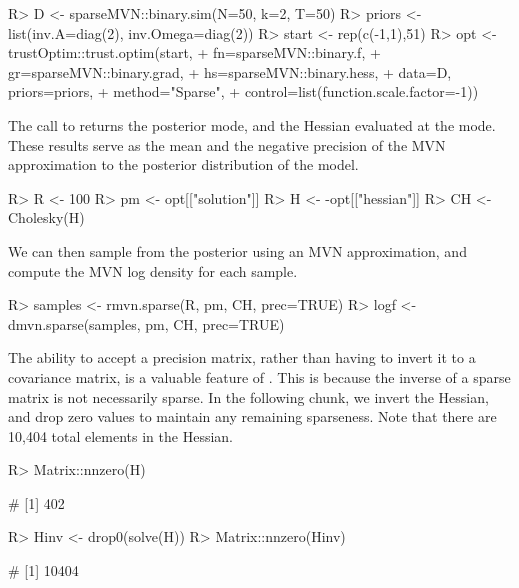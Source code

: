 \documentclass[codesnippet]{jss}\usepackage[]{graphicx}\usepackage[]{color}
\newcommand{\func}[1]{\code{#1}}
\begin{document}
\begin{Schunk}
\begin{Sinput}
R> D <- sparseMVN::binary.sim(N=50, k=2, T=50)
R> priors <- list(inv.A=diag(2), inv.Omega=diag(2))
R> start <- rep(c(-1,1),51)
R> opt <- trustOptim::trust.optim(start,
+                                fn=sparseMVN::binary.f,
+                                gr=sparseMVN::binary.grad,
+                                hs=sparseMVN::binary.hess,
+                                data=D, priors=priors,
+                                method="Sparse",
+                                control=list(function.scale.factor=-1))
\end{Sinput}
\end{Schunk}

The call to \func{trust.optim} returns the posterior mode, and the
Hessian evaluated at the mode. These results serve as the mean and the negative precision
of the MVN approximation to the posterior distribution of the model.

\begin{Schunk}
\begin{Sinput}
R> R <- 100
R> pm <- opt[["solution"]]
R> H <- -opt[["hessian"]]
R> CH <- Cholesky(H)
\end{Sinput}
\end{Schunk}

We can then sample from the posterior using an MVN approximation, and compute the MVN log density for each sample.

\begin{Schunk}
\begin{Sinput}
R> samples <- rmvn.sparse(R, pm, CH, prec=TRUE)
R> logf <- dmvn.sparse(samples, pm, CH, prec=TRUE)
\end{Sinput}
\end{Schunk}

The ability to accept a precision matrix, rather than having to invert
it to a covariance matrix, is a valuable feature of .
This is because the inverse of a sparse matrix is not necessarily
sparse. In the following chunk, we invert the Hessian, and drop zero
values to maintain any remaining sparseness. Note that there are
10,404 total elements in the Hessian.

\begin{Schunk}
\begin{Sinput}
R> Matrix::nnzero(H)
\end{Sinput}
\begin{Soutput}
# [1] 402
\end{Soutput}
\begin{Sinput}
R> Hinv <- drop0(solve(H))
R> Matrix::nnzero(Hinv)
\end{Sinput}
\begin{Soutput}
# [1] 10404
\end{Soutput}
\end{Schunk}
\end{document}
